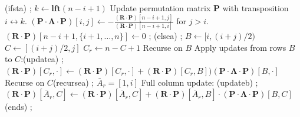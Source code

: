 \documentclass[10pt,a4paper]{article}
\newcommand{\mat}[1]{\mathbf{#1}}
\newcommand{\lft}{\mathbf{lft}}
\begin{document}
\begin{algorithm}[h]\caption{Row Algorithm($A = [i,j]$)}
\label{alg:row-tree}
\begin{algorithmic}[1]
      \node (ifsta) {};
        \State $k \gets \lft  (n-i+1)$ 
            \State Update permutation matrix $\mat{P}$ with transposition $i \leftrightarrow k$.
            \State $(\mat{P} \!\cdot \!\mat{\Lambda}\!\cdot\!\mat{P} )[i,j] \gets
        -\frac{(\mat{R}\cdot\mat{P} )[n-i+1,j]}{(\mat{R}\cdot\mat{P})[n-i+1,i]}$ for $j > i$.
            \State $(\mat{R}\!\cdot\!\mat{P})[n-i+1, \{i+1, \ldots,n\}]\gets 0 $ \label{lin:zero-out} ;
    \Else {} \node (elsea) {};
        \State $B \gets [i, (i+j)/2)$ 
        \State $C \gets [(i+j)/2, j]$ 
        \State $C_r \gets n-C+1$ 
        \State Recurse on $B$
        \State Apply updates from rows $B$ to $C$: \node (updatea) {};
        \Statex \qquad $(\mat{R}\!\cdot\!\mat{P} )[C_r,\cdot ] \gets (\mat{R}\!\cdot\!\mat{P} )[C_r, \cdot ]  +
                    (\mat{R}\!\cdot\!\mat{P})[C_r,B]) (\mat{P}\!\cdot\!\mat{\Lambda}\!\cdot\!\mat{P})[B,\cdot]$ 
        \State Recurse on $C$ \node (recursea) {};
        \State $\bar{A}_r = [1,i]$ 
        \State Full column update:   \node (updateb) {};
        \Statex \qquad $(\mat{R}\!\cdot\!\mat{P})[\bar{A}_r, C] \gets
                    (\mat{R}\!\cdot\!\mat{P})[\bar{A}_r, C] + (\mat{R}\!\cdot\!\mat{P})[\bar{A}_r, B] \cdot (\mat{P} \!\cdot\! \mat{\Lambda}\!\cdot\!\mat{P})[B,C]$   
                     \node (ends) {\!\!};
    \EndIf
                \vspace{-0.4cm}
\end{algorithmic}
\end{algorithm}
\end{document}
